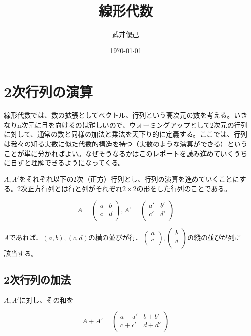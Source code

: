 \documentclass[dvipdfmx,autodetect-engine]{jsarticle}
\title{線形代数}
\author{武井優己}
\date{\today}
\theoremstyle{definition}
\begin{document}
\maketitle

\tableofcontents

\section{2次行列の演算}

線形代数では、数の拡張としてベクトル、行列という高次元の数を考える。いきなりn次元に目を向けるのは難しいので、ウォーミングアップとして2次元の行列に対して、通常の数と同様の加法と乗法を天下り的に定義する。ここでは、行列は我々の知る実数に似た代数的構造を持つ（実数のような演算ができる）ということが単に分かればよい。なぜそうなるかはこのレポートを読み進めていくうちに自ずと理解できるようになってくる。

$A, A'$をそれぞれ以下の2次（正方）行列とし、行列の演算を進めていくことにする。2次正方行列とは行と列がそれぞれ$2 \times 2$の形をした行列のことである。

$$
A = \begin{pmatrix}
a & b \\
c & d \\
\end{pmatrix},
A' = \begin{pmatrix}
a' & b' \\
c' & d' \\
\end{pmatrix}
$$

$A$であれば、$(a, b), (c, d)$の横の並びが行、$\begin{pmatrix}
a \\
c \\
\end{pmatrix}, \begin{pmatrix}
b \\
d \\
\end{pmatrix}$の縦の並びが列に該当する。


\subsection{2次行列の加法}

$A, A'$に対し、その和を

$$
A + A' = \begin{pmatrix}
a + a' & b + b' \\
c + c' & d + d'\\
\end{pmatrix}
$$
\end{document}
